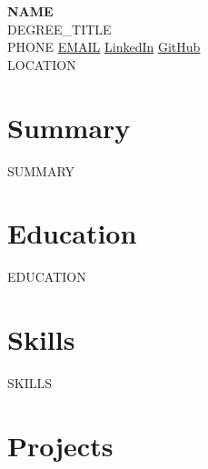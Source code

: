 \documentclass[a4paper,10pt]{article}
\begin{document}

\begin{center}

{\Large \textbf{{{NAME}}}}\\[-3pt]

{{DEGREE_TITLE}}\\[-2pt]

{{PHONE}}
\quad
\href{mailto:{{EMAIL}}}{{{EMAIL}}}
\quad
\href{https://linkedin.com/in/{{LINKEDIN_USERNAME}}}{LinkedIn}
\quad
\href{https://github.com/{{GITHUB_USERNAME}}}{GitHub}
\\[-3pt]

{{LOCATION}}

\end{center}

\vspace{-6pt}



\section*{Summary}

{{SUMMARY}}



\section*{Education}

{{EDUCATION}}



\section*{Skills}

{{SKILLS}}



\section*{Projects}
\end{document}
